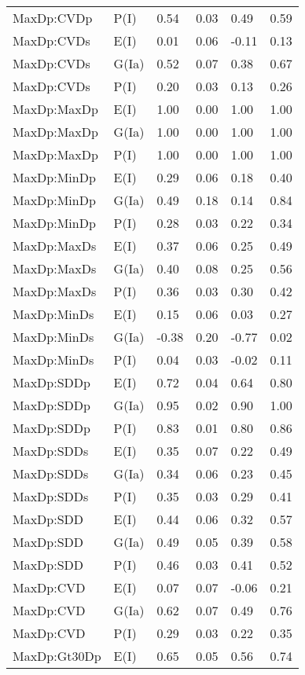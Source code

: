 \begin{center}
\begin{longtable}{|p{1.1in}|p{0.7in}|p{0.7in}|p{0.6in}|p{0.6in}|p{0.6in}|}
  MaxDp:CVDp & P(I) & 0.54 & 0.03 & 0.49 & 0.59 \\ 
  MaxDp:CVDs & E(I) & 0.01 & 0.06 & -0.11 & 0.13 \\ 
  MaxDp:CVDs & G(Ia) & 0.52 & 0.07 & 0.38 & 0.67 \\ 
  MaxDp:CVDs & P(I) & 0.20 & 0.03 & 0.13 & 0.26 \\ 
  MaxDp:MaxDp & E(I) & 1.00 & 0.00 & 1.00 & 1.00 \\ 
  MaxDp:MaxDp & G(Ia) & 1.00 & 0.00 & 1.00 & 1.00 \\ 
  MaxDp:MaxDp & P(I) & 1.00 & 0.00 & 1.00 & 1.00 \\ 
  MaxDp:MinDp & E(I) & 0.29 & 0.06 & 0.18 & 0.40 \\ 
  MaxDp:MinDp & G(Ia) & 0.49 & 0.18 & 0.14 & 0.84 \\ 
  MaxDp:MinDp & P(I) & 0.28 & 0.03 & 0.22 & 0.34 \\ 
  MaxDp:MaxDs & E(I) & 0.37 & 0.06 & 0.25 & 0.49 \\ 
  MaxDp:MaxDs & G(Ia) & 0.40 & 0.08 & 0.25 & 0.56 \\ 
  MaxDp:MaxDs & P(I) & 0.36 & 0.03 & 0.30 & 0.42 \\ 
  MaxDp:MinDs & E(I) & 0.15 & 0.06 & 0.03 & 0.27 \\ 
  MaxDp:MinDs & G(Ia) & -0.38 & 0.20 & -0.77 & 0.02 \\ 
  MaxDp:MinDs & P(I) & 0.04 & 0.03 & -0.02 & 0.11 \\ 
  MaxDp:SDDp & E(I) & 0.72 & 0.04 & 0.64 & 0.80 \\ 
  MaxDp:SDDp & G(Ia) & 0.95 & 0.02 & 0.90 & 1.00 \\ 
  MaxDp:SDDp & P(I) & 0.83 & 0.01 & 0.80 & 0.86 \\ 
  MaxDp:SDDs & E(I) & 0.35 & 0.07 & 0.22 & 0.49 \\ 
  MaxDp:SDDs & G(Ia) & 0.34 & 0.06 & 0.23 & 0.45 \\ 
  MaxDp:SDDs & P(I) & 0.35 & 0.03 & 0.29 & 0.41 \\ 
  MaxDp:SDD & E(I) & 0.44 & 0.06 & 0.32 & 0.57 \\ 
  MaxDp:SDD & G(Ia) & 0.49 & 0.05 & 0.39 & 0.58 \\ 
  MaxDp:SDD & P(I) & 0.46 & 0.03 & 0.41 & 0.52 \\ 
  MaxDp:CVD & E(I) & 0.07 & 0.07 & -0.06 & 0.21 \\ 
  MaxDp:CVD & G(Ia) & 0.62 & 0.07 & 0.49 & 0.76 \\ 
  MaxDp:CVD & P(I) & 0.29 & 0.03 & 0.22 & 0.35 \\ 
  MaxDp:Gt30Dp & E(I) & 0.65 & 0.05 & 0.56 & 0.74 \\ 

\end{longtable}
\end{center}
